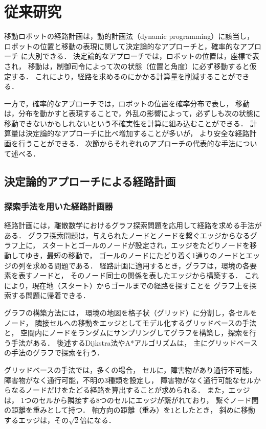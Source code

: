 \section{従来研究}\label{sec:previous_research}
移動ロボットの経路計画は，動的計画法（dynamic programming）\cite{Bellman1957}に該当し，
ロボットの位置と移動の表現に関して決定論的なアプローチと，確率的なアプローチ
に大別できる．
決定論的なアプローチでは，ロボットの位置は，座標で表され，
移動は，制御司令によって次の状態（位置と角度）に必ず移動すると仮定する．
これにより，経路を求めるのにかかる計算量を削減することができる．

一方で，確率的なアプローチでは，ロボットの位置を確率分布で表し，
移動は，分布を動かすと表現することで，外乱の影響によって，必ずしも次の状態に
移動できないかもしれないという不確実性を計算に組み込むことができる．
計算量は決定論的なアプローチに比べ増加することが多いが，
より安全な経路計画を行うことができる．
次節からそれぞれのアプローチの代表的な手法について述べる．


\subsection{決定論的アプローチによる経路計画}

\subsubsection{探索手法を用いた経路計画器}
経路計画には，離散数学におけるグラフ探索問題を応用して経路を求める手法がある．
グラフ探索問題は，与えられたノードとノードを繋ぐエッジからなるグラフ上に，
スタートとゴールのノードが設定され，エッジをたどりノードを移動してゆき，最短の移動で，
ゴールのノードにたどり着く1通りのノードとエッジの列を求める問題である．
経路計画に適用するとき，グラフは，環境の各要素を表すノードと，
そのノード同士の関係を表したエッジから構築する．
これにより，現在地（スタート）からゴールまでの経路を探すことを
グラフ上を探索する問題に帰着できる．

グラフの構築方法には，
環境の地図を格子状（グリッド）に分割し，各セルをノード，
隣接セルへの移動をエッジとしてモデル化するグリッドベースの手法と，
空間内にノードをランダムにサンプリングしてグラフを構築し，探索を行う手法がある．
後述するDijkstra法\cite{Dijkstra1959}やA*アルゴリズム\cite{Hart1968}は，
主にグリッドベースの手法のグラフで探索を行う．

グリッドベースの手法では，多くの場合，
セルに，障害物があり通行不可能，障害物がなく通行可能，不明の3種類を設定し，
障害物がなく通行可能なセルからなるノードだけをたどる経路を算出することが求められる．
また，エッジは，
1つのセルから隣接する8つのセルにエッジが繋がれており，
繋ぐノード間の距離を重みとして持つ．
軸方向の距離（重み）を$1$としたとき，
斜めに移動するエッジは，その$\sqrt{2}$倍になる．

